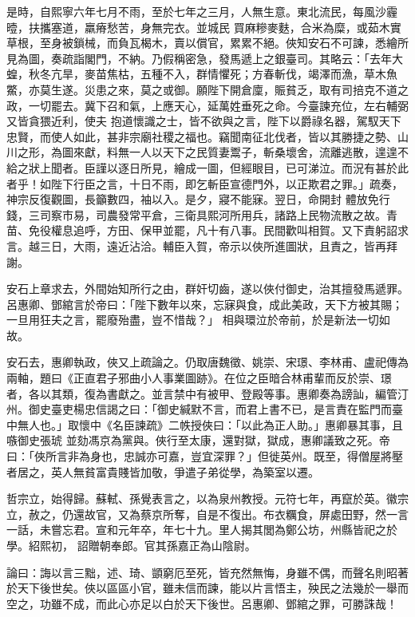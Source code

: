 \begin{pinyinscope}
 是時，自熙寧六年七月不雨，至於七年之三月，人無生意。東北流民，每風沙霾曀，扶攜塞道，羸瘠愁苦，身無完衣。並城民
 買麻糝麥麩，合米為糜，或茹木實草根，至身被鎖械，而負瓦楬木，賣以償官，累累不絕。俠知安石不可諫，悉繪所見為圖，奏疏詣閣門，不納。乃假稱密急，發馬遞上之銀臺司。其略云：「去年大蝗，秋冬亢旱，麥苗焦枯，五種不入，群情懼死；方春斬伐，竭澤而漁，草木魚鱉，亦莫生遂。災患之來，莫之或御。願陛下開倉廩，賑貧乏，取有司掊克不道之政，一切罷去。冀下召和氣，上應天心，延萬姓垂死之命。今臺諫充位，左右輔弼又皆貪猥近利，使夫
 抱道懷識之士，皆不欲與之言，陛下以爵祿名器，駕馭天下忠賢，而使人如此，甚非宗廟社稷之福也。竊聞南征北伐者，皆以其勝捷之勢、山川之形，為圖來獻，料無一人以天下之民質妻鬻子，斬桑壞舍，流離逃散，遑遑不給之狀上聞者。臣謹以逐日所見，繪成一圖，但經眼目，已可涕泣。而況有甚於此者乎！如陛下行臣之言，十日不雨，即乞斬臣宣德門外，以正欺君之罪。」疏奏，神宗反復觀圖，長籲數四，袖以入。是夕，寢不能寐。翌日，命開封
 體放免行錢，三司察市易，司農發常平倉，三衛具熙河所用兵，諸路上民物流散之故。青苗、免役權息追呼，方田、保甲並罷，凡十有八事。民間歡叫相賀。又下責躬詔求言。越三日，大雨，遠近沾洽。輔臣入賀，帝示以俠所進圖狀，且責之，皆再拜謝。



 安石上章求去，外間始知所行之由，群奸切齒，遂以俠付御史，治其擅發馬遞罪。呂惠卿、鄧綰言於帝曰：「陛下數年以來，忘寐與食，成此美政，天下方被其賜；一旦用狂夫之言，罷廢殆盡，豈不惜哉？」
 相與環泣於帝前，於是新法一切如故。



 安石去，惠卿執政，俠又上疏論之。仍取唐魏徵、姚崇、宋璟、李林甫、盧祀傳為兩軸，題曰《正直君子邪曲小人事業圖跡》。在位之臣暗合林甫輩而反於崇、璟者，各以其類，復為書獻之。並言禁中有被甲、登殿等事。惠卿奏為謗訕，編管汀州。御史臺吏楊忠信謁之曰：「御史緘默不言，而君上書不已，是言責在監門而臺中無人也。」取懷中《名臣諫疏》二帙授俠曰：「以此為正人助。」惠卿暴其事，且嗾御史張琥
 並劾馮京為黨與。俠行至太康，還對獄，獄成，惠卿議致之死。帝曰：「俠所言非為身也，忠誠亦可嘉，豈宜深罪？」但徙英州。既至，得僧屋將壓者居之，英人無貧富貴賤皆加敬，爭遣子弟從學，為築室以遷。



 哲宗立，始得歸。蘇軾、孫覺表言之，以為泉州教授。元符七年，再竄於英。徽宗立，赦之，仍還故官，又為蔡京所奪，自是不復出。布衣糲食，屏處田野，然一言一話，未嘗忘君。宣和元年卒，年七十九。里人揭其閭為鄭公坊，州縣皆祀之於學。紹熙初，
 詔贈朝奉郎。官其孫嘉正為山陰尉。



 論曰：誨以言三黜，述、琦、顗窮厄至死，皆充然無悔，身雖不偶，而聲名則昭著於天下後世矣。俠以區區小官，雖未信而諫，能以片言悟主，殃民之法幾於一舉而空之，功雖不成，而此心亦足以白於天下後世。呂惠卿、鄧綰之罪，可勝誅哉！



\end{pinyinscope}
